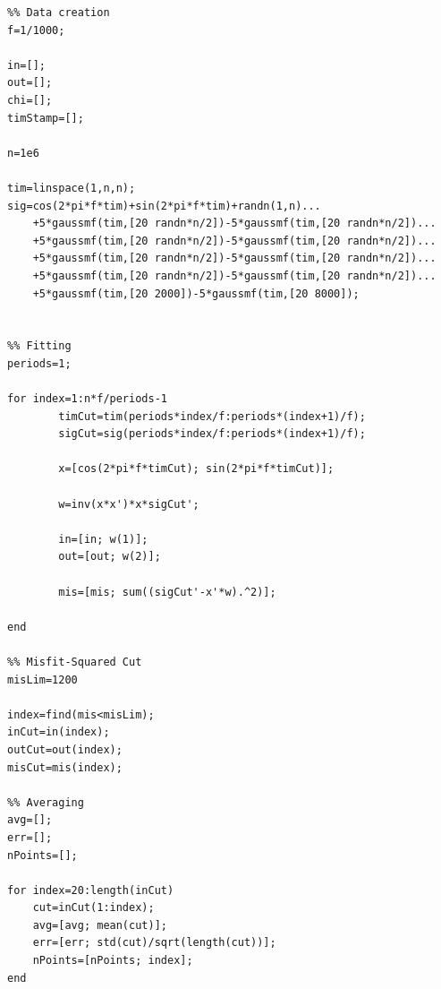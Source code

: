 \documentclass{article}
\begin{document}
\begin{lstlisting}
%% Data creation
f=1/1000;

in=[];
out=[];
chi=[];
timStamp=[];

n=1e6

tim=linspace(1,n,n);
sig=cos(2*pi*f*tim)+sin(2*pi*f*tim)+randn(1,n)...
    +5*gaussmf(tim,[20 randn*n/2])-5*gaussmf(tim,[20 randn*n/2])...
    +5*gaussmf(tim,[20 randn*n/2])-5*gaussmf(tim,[20 randn*n/2])...
    +5*gaussmf(tim,[20 randn*n/2])-5*gaussmf(tim,[20 randn*n/2])...
    +5*gaussmf(tim,[20 randn*n/2])-5*gaussmf(tim,[20 randn*n/2])...
    +5*gaussmf(tim,[20 2000])-5*gaussmf(tim,[20 8000]);


%% Fitting
periods=1;

for index=1:n*f/periods-1
        timCut=tim(periods*index/f:periods*(index+1)/f);
        sigCut=sig(periods*index/f:periods*(index+1)/f);

        x=[cos(2*pi*f*timCut); sin(2*pi*f*timCut)];

        w=inv(x*x')*x*sigCut';

        in=[in; w(1)];
        out=[out; w(2)];

        mis=[mis; sum((sigCut'-x'*w).^2)];

end

%% Misfit-Squared Cut
misLim=1200

index=find(mis<misLim);
inCut=in(index);
outCut=out(index);
misCut=mis(index);

%% Averaging
avg=[];
err=[];
nPoints=[];

for index=20:length(inCut)
    cut=inCut(1:index);
    avg=[avg; mean(cut)];
    err=[err; std(cut)/sqrt(length(cut))];
    nPoints=[nPoints; index];
end

\end{lstlisting}
\end{document}
